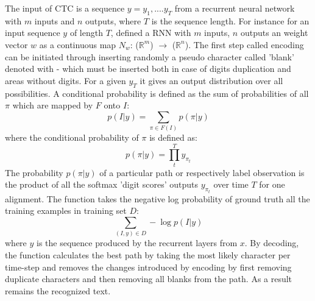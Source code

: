 The input of CTC is
a sequence $y=y_{1},....y_{T}$ from a recurrent neural network with $m$ inputs
and $n$ outputs, where $T$ is the sequence length. For instance for an input
sequence $y$ of length $T$, defined a RNN with $m$ inputs, $n$ outputs an
weight vector $w$ as a continuous map $N_w$: ($\mathbb{R}^m$) $\rightarrow$
($\mathbb{R}^n$). The first step called encoding can be initiated through
inserting randomly a pseudo character called 'blank' denoted with {-} which must
be inserted both in case of digits duplication and areas without digits. For a
given $y_{T}$ it gives an output distribution over all possibilities. A
conditional probability is defined as the sum of probabilities of all $\pi$
which are mapped by $F$ onto $I$:
\begin{equation}
p( I | y)=\sum_{\pi \in F(I)} p( \pi | y )
\label{eq1}
\end{equation}
where the conditional probability of $\pi$ is defined as: 
\begin{equation}
p( \pi | y ) =\prod_t^T y_{\pi_{t}}
\label{eq2}
\end{equation}
The probability $p( \pi | y )$ of a particular path or respectively label
observation is the product of all the softmax 'digit scores' outputs $y_{\pi_{t}}$
over time $T$ for one alignment. The function takes the negative log probability
of ground truth all the training examples in training set $D$:
\begin{equation}
\sum_{(I,y) \in D} - \log  p( I | y )
\label{eq3}
\end{equation}
where $y$ is the sequence produced by the recurrent layers from $x$. By
decoding, the function calculates the best path by taking the most likely
character per time-step and removes the changes introduced by encoding by first
removing duplicate characters and then removing all blanks from the path. As
a result remains the recognized text.

